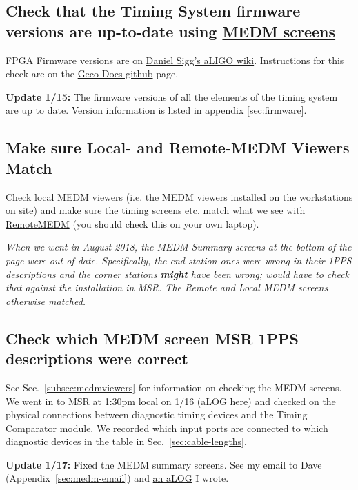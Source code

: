 \documentclass{article}
\begin{document}
\subsection{Check that the Timing System firmware versions are up-to-date using 
\href{https://wiki.ligo.org/RemoteAccess/RemoteEPICS}{MEDM screens}}

FPGA Firmware versions are on \href{https://awiki.ligo-wa.caltech.edu/wiki/TimingFpgaCode}{Daniel Sigg's aLIGO wiki}. Instructions for this check are on the \href{https://github.com/stefco/geco_docs/blob/master/3-timing-fpga-code.md}{Geco Docs github} page.

\textbf{Update 1/15:} The firmware versions of all the elements of the timing system are up to date. Version information is listed in appendix \ref{sec:firmware}.

\subsection{\label{subsec:medmviewers} Make sure Local- and Remote-MEDM Viewers Match}

Check local MEDM viewers (i.e. the MEDM viewers installed on the workstations on site) and make sure the timing screens etc. match what we see with \href{https://wiki.ligo.org/RemoteAccess/RemoteEPICS}{RemoteMEDM} (you should check this on your own laptop).

\textit{When we went in August 2018, the MEDM Summary screens at the bottom of the page were out of date. Specifically, the end station ones were wrong in their 1PPS descriptions and the corner stations \textbf{might} have been wrong; would have to check that against the installation in MSR. The Remote and Local MEDM screens otherwise matched.}

\subsection{Check which MEDM screen MSR 1PPS descriptions were correct}

See Sec.~\ref{subsec:medmviewers} for information on checking the MEDM screens. We went in to MSR at 1:30pm local on 1/16 (\href{https://alog.ligo-wa.caltech.edu/aLOG/index.php?callRep=46477}{aLOG here}) and checked on the physical connections between diagnostic timing devices and the Timing Comparator module. We recorded which input ports are connected to which diagnostic devices in the table in Sec.~\ref{sec:cable-lengths}.

\textbf{Update 1/17:} Fixed the MEDM summary screens. See my email to Dave (Appendix~\ref{sec:medm-email}) and \href{https://alog.ligo-wa.caltech.edu/aLOG/index.php?callRep=46500}{an aLOG} I wrote.
\end{document}
